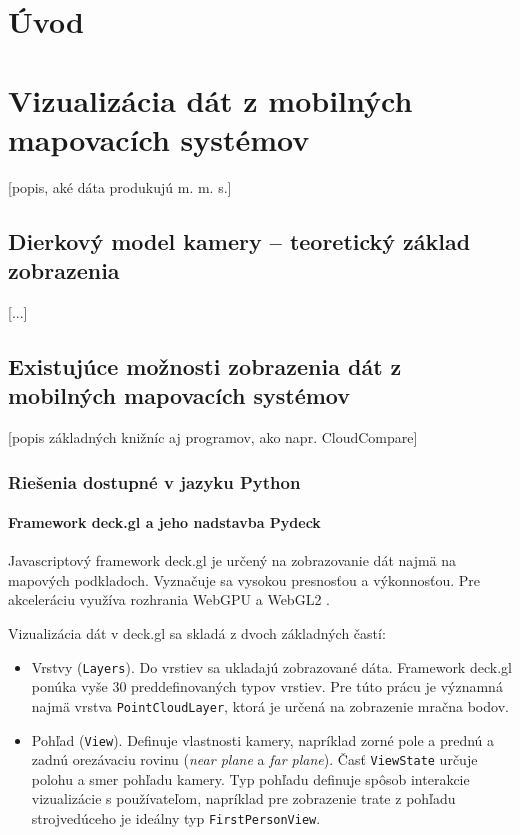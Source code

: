 %

\chapter{Úvod}

\chapter{Vizualizácia dát z mobilných mapovacích systémov}

[popis, aké dáta produkujú m. m. s.]

\section{Dierkový model kamery -- teoretický základ zobrazenia}

[...]

\section{Existujúce možnosti zobrazenia dát z mobilných mapovacích systémov}

[popis základných knižníc aj programov, ako napr. CloudCompare]

\subsection{Riešenia dostupné v jazyku Python}
\subsubsection{Framework deck.gl a jeho nadstavba Pydeck}

Javascriptový framework deck.gl je určený na zobrazovanie dát najmä na mapových podkladoch. Vyznačuje sa vysokou presnosťou a výkonnosťou. Pre akceleráciu využíva rozhrania WebGPU a WebGL2 \cite{deck.gl_documentation}.

Vizualizácia dát v deck.gl sa skladá z dvoch základných častí:
\begin{itemize}
    \item Vrstvy (\texttt{Layers}). Do vrstiev sa ukladajú zobrazované dáta. Framework deck.gl ponúka vyše 30 preddefinovaných typov vrstiev. Pre túto prácu je významná najmä vrstva \texttt{PointCloudLayer}, ktorá je určená na zobrazenie mračna bodov.
    \item Pohľad (\texttt{View}). Definuje vlastnosti kamery, napríklad zorné pole a prednú a zadnú orezávaciu rovinu (\emph{near plane} a \emph{far plane}).
    Časť \texttt{ViewState} určuje polohu a smer pohľadu kamery. Typ pohľadu definuje spôsob interakcie vizualizácie s používateľom, napríklad pre zobrazenie trate z pohľadu strojvedúceho je ideálny typ \texttt{FirstPersonView}.
\end{itemize}

